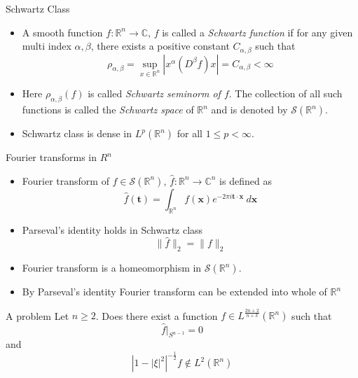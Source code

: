 \documentclass[compress]{beamer}
\newcommand{\R}{\mathbb R}
\newcommand{\C}{\mathbb C}
\begin{document}
\begin{frame}{Schwartz Class}
  \begin{itemize}
    \item A smooth function $f:\mathbb{R}^n \to \mathbb{C}$, $f$ is called a \emph{Schwartz function} if for any given multi index $\alpha, \beta$, there exists a positive constant $C_{\alpha, \beta}$ such that 
      \begin{equation}
        \rho_{\alpha, \beta} = \sup_{x \in \mathbb{R}^n} \left|x^\alpha (D^\beta f)x \right| = C_{\alpha, \beta} < \infty
        \label{eq:Schwartz_class}
      \end{equation}
    \pause
    \item Here $\rho_{\alpha, \beta}(f)$ is called \emph{Schwartz seminorm of $f$}. The collection of all such functions is called the \emph{Schwartz space} of $\mathbb{R}^n$ and is denoted by $\mathscr{S}(\mathbb{R}^n)$.
    \pause
    \item Schwartz class is dense in $L^p(\R^n)$ for all $1\le p < \infty$.
  \end{itemize}
\end{frame}

\begin{frame}{Fourier transforms in $R^n$}
  \begin{itemize}
    \item Fourier transform of $f \in \mathscr{S}(\R^n)$, $\hat{f} : \R^n \to \C^n$ is defined as 
      \begin{equation}
        \hat{f}( \textbf{t} ) = \int_{\R^n} f(\textbf{x})e^{-2 \pi i \textbf{t} \cdot \textbf{x}} \ d\textbf{x}
        \label{eq:F_tranform_in_Rn}
      \end{equation}
    \pause
    \item Parseval's identity holds in Schwartz class 
      \begin{equation}
        \|\hat{f}\|_2 = \|f\|_2
        \label{eq:parseval_id_in_Rn}
      \end{equation}
    \pause
    \item Fourier transform is a homeomorphism in $\mathscr{S}(\R^n)$.
    \pause
    \item By Parseval's identity Fourier transform can be extended into whole of $\R^n$
  \end{itemize}
\end{frame}

\begin{frame}{A problem}
  Let $n \ge 2$. Does there exist a function $f \in L^{\frac{2n+2}{n+3}}(\R^n)$ such that $$\hat{f}\vert_{S^{n-1}} = 0$$
and
$$\left| 1 - |\xi|^2\right|^{-\frac{1}{2}}f \notin L^2(\R^n)$$
\end{frame}
\end{document}
